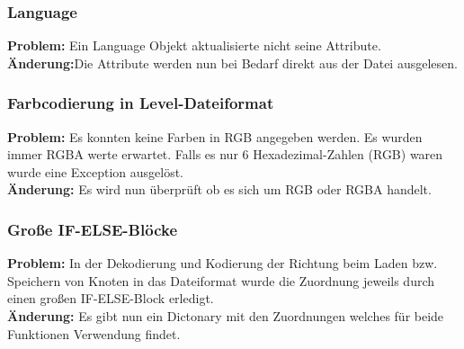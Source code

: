 \subsubsection*{Language}
\textbf{Problem:}
Ein Language Objekt aktualisierte nicht seine Attribute.
\\
\textbf{Änderung:}Die Attribute werden nun bei Bedarf direkt aus der Datei ausgelesen.

\subsubsection*{Farbcodierung in Level-Dateiformat}
\textbf{Problem:}
Es konnten keine Farben in RGB angegeben werden. Es wurden immer RGBA werte erwartet.
Falls es nur 6 Hexadezimal-Zahlen (RGB) waren wurde eine Exception ausgelöst.
\\
\textbf{Änderung:} Es wird nun überprüft ob es sich um RGB oder RGBA handelt.

\subsubsection*{Große IF-ELSE-Blöcke}
\textbf{Problem:}
In der Dekodierung und Kodierung der Richtung beim Laden bzw. Speichern von Knoten in das Dateiformat wurde die Zuordnung jeweils durch einen großen IF-ELSE-Block erledigt.
\\
\textbf{Änderung:} Es gibt nun ein Dictonary mit den Zuordnungen welches für beide Funktionen Verwendung findet.









